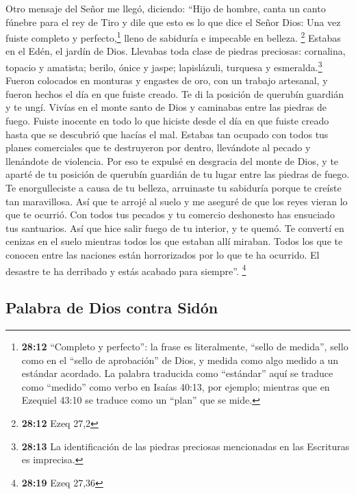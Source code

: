  Otro mensaje del Señor me llegó, diciendo:
 ``Hijo de hombre, canta un canto fúnebre para el rey de
Tiro y dile que esto es lo que dice el Señor Dios: Una vez fuiste
completo y perfecto,\footnote{\textbf{28:12} ``Completo y perfecto'': la
  frase es literalmente, ``sello de medida'', sello como en el ``sello
  de aprobación'' de Dios, y medida como algo medido a un estándar
  acordado. La palabra traducida como ``estándar'' aquí se traduce como
  ``medido'' como verbo en Isaías 40:13, por ejemplo; mientras que en
  Ezequiel 43:10 se traduce como un ``plan'' que se mide.} lleno de
sabiduría e impecable en belleza. \footnote{\textbf{28:12} Ezeq 27,2}
 Estabas en el Edén, el jardín de Dios. Llevabas toda
clase de piedras preciosas: cornalina, topacio y amatista; berilo, ónice
y jaspe; lapislázuli, turquesa y esmeralda.\footnote{\textbf{28:13} La
  identificación de las piedras preciosas mencionadas en las Escrituras
  es imprecisa.} Fueron colocados en monturas y engastes de oro, con un
trabajo artesanal, y fueron hechos el día en que fuiste creado.
 Te di la posición de querubín guardián y te ungí. Vivías
en el monte santo de Dios y caminabas entre las piedras de fuego.
 Fuiste inocente en todo lo que hiciste desde el día en
que fuiste creado hasta que se descubrió que hacías el mal.
 Estabas tan ocupado con todos tus planes comerciales que
te destruyeron por dentro, llevándote al pecado y llenándote de
violencia. Por eso te expulsé en desgracia del monte de Dios, y te
aparté de tu posición de querubín guardián de tu lugar entre las piedras
de fuego.  Te enorgulleciste a causa de tu belleza,
arruinaste tu sabiduría porque te creíste tan maravillosa. Así que te
arrojé al suelo y me aseguré de que los reyes vieran lo que te ocurrió.
 Con todos tus pecados y tu comercio deshonesto has
ensuciado tus santuarios. Así que hice salir fuego de tu interior, y te
quemó. Te convertí en cenizas en el suelo mientras todos los que estaban
allí miraban.  Todos los que te conocen entre las
naciones están horrorizados por lo que te ha ocurrido. El desastre te ha
derribado y estás acabado para siempre''. \footnote{\textbf{28:19} Ezeq
  27,36}

\hypertarget{palabra-de-dios-contra-siduxf3n}{%
\subsection{Palabra de Dios contra
Sidón}\label{palabra-de-dios-contra-siduxf3n}}

